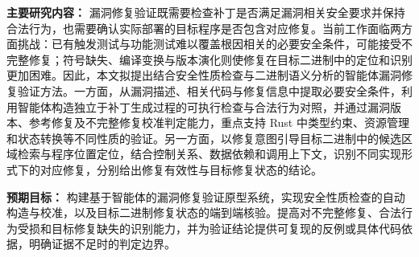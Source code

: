 \textbf{主要研究内容：}
漏洞修复验证既需要检查补丁是否满足漏洞相关安全要求并保持合法行为，也需要确认实际部署的目标程序是否包含对应修复。当前工作面临两方面挑战：已有触发测试与功能测试难以覆盖根因相关的必要安全条件，可能接受不完整修复；符号缺失、编译变换与版本演化则使修复在目标二进制中的定位和识别更加困难。因此，本文拟提出结合安全性质检查与二进制语义分析的智能体漏洞修复验证方法。一方面，从漏洞描述、相关代码与修复信息中提取必要安全条件，利用智能体构造独立于补丁生成过程的可执行检查与合法行为对照，并通过漏洞版本、参考修复及不完整修复校准判定能力，重点支持 Rust 中类型约束、资源管理和状态转换等不同性质的验证。另一方面，以修复意图引导目标二进制中的候选区域检索与程序位置定位，结合控制关系、数据依赖和调用上下文，识别不同实现形式下的对应修复，分别给出修复有效性与目标修复状态的结论。

\textbf{预期目标：}
构建基于智能体的漏洞修复验证原型系统，实现安全性质检查的自动构造与校准，以及目标二进制修复状态的端到端核验。提高对不完整修复、合法行为受损和目标修复缺失的识别能力，并为验证结论提供可复现的反例或具体代码依据，明确证据不足时的判定边界。



